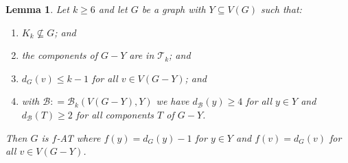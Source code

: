 \documentclass[12pt]{article}
\theoremstyle{plain}
\newtheorem{lem}[thm]{Lemma}
\theoremstyle{definition}
\theoremstyle{remark}
\newcommand{\fancy}[1]{\mathcal{#1}}
\newcommand{\T}{\fancy{T}}
\newcommand{\B}{\fancy{B}}
\newcommand{\DefinedAs}{\mathrel{\mathop:}=}
\begin{document}
\begin{lem}\label{MultipleHighConfigurationEulerLopsided}
Let $k \geq 6$ and let $G$ be a graph with $Y \subseteq V(G)$ such that:
\begin{enumerate}
\item $K_k \not \subseteq G$; and
\item the components of $G-Y$ are in $\T_k$; and
\item $d_G(v) \leq k - 1$ for all $v \in V(G-Y)$; and
\item with $\B \DefinedAs \B_k(V(G-Y), Y)$ we have $d_{\B}(y) \geq 4$ for all $y \in Y$ and $d_{\B}(T) \geq 2$ for all components $T$ of $G-Y$.
\end{enumerate}

\noindent Then $G$ is $f$-AT where $f(y) = d_G(y) - 1$ for $y \in Y$ and $f(v) = d_G(v)$ for all $v \in V(G - Y)$.
\end{lem}
\end{document}
